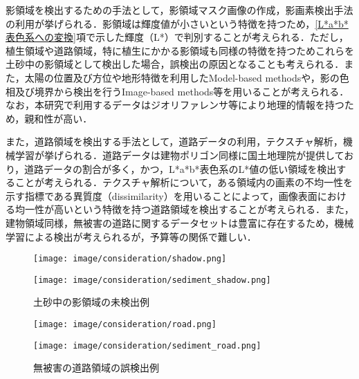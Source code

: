       影領域を検出するための手法として，影領域マスク画像の作成，影画素検出手法の利用が挙げられる．影領域は輝度値が小さいという特徴を持つため，\ref{L*a*b*表色系への変換}項で示した輝度（L*）で判別することが考えられる．ただし，植生領域や道路領域，特に植生にかかる影領域も同様の特徴を持つためこれらを土砂中の影領域として検出した場合，誤検出の原因となることも考えられる．また，太陽の位置及び方位や地形特徴を利用したModel-based methodsや，影の色相及び境界から検出を行うImage-based methods等を用いることが考えられる．なお，本研究で利用するデータはジオリファレンサ等により地理的情報を持つため，親和性が高い\cite{影領域検出}．

      また，道路領域を検出する手法として，道路データの利用，テクスチャ解析，機械学習が挙げられる．道路データは建物ポリゴン同様に国土地理院が提供しており，道路データの割合が多く，かつ，L*a*b*表色系のL*値の低い領域を検出することが考えられる．テクスチャ解析について，ある領域内の画素の不均一性を示す指標である異質度（dissimilarity）を用いることによって，画像表面における均一性が高いという特徴を持つ道路領域を検出することが考えられる．また，建物領域同様，無被害の道路に関するデータセットは豊富に存在するため，機械学習による検出が考えられるが，予算等の関係で難しい．

      \begin{figure}[t]
        \begin{minipage}[c]{0.45\hsize}
          \centering
          \texttt{[image: image/consideration/shadow.png]}
        \end{minipage}
        \begin{minipage}[c]{0.45\hsize}
          \centering
          \texttt{[image: image/consideration/sediment\_shadow.png]}
        \end{minipage}
        \caption{土砂中の影領域の未検出例}
        \label{影領域}
      \end{figure}
      
      \begin{figure}[t]
        \begin{minipage}[c]{0.45\hsize}
          \centering
          \texttt{[image: image/consideration/road.png]}
        \end{minipage}
        \begin{minipage}[c]{0.45\hsize}
          \centering
          \texttt{[image: image/consideration/sediment\_road.png]}
        \end{minipage}
        \caption{無被害の道路領域の誤検出例}
        \label{道路領域}
      \end{figure}


